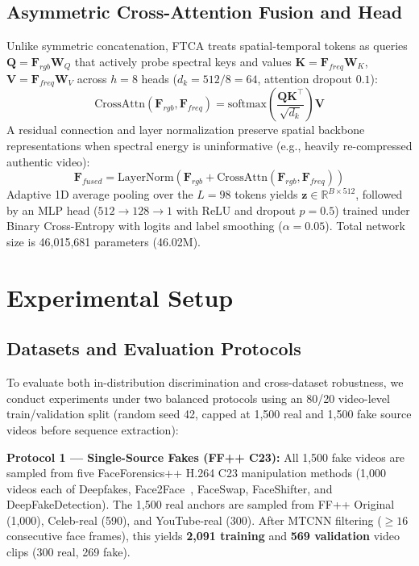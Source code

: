 \documentclass[conference,10pt]{IEEEtran}
\begin{document}
\subsection{Asymmetric Cross-Attention Fusion and Head}
Unlike symmetric concatenation, FTCA treats spatial-temporal tokens as queries $\mathbf{Q} = \mathbf{F}_{rgb}\mathbf{W}_Q$ that actively probe spectral keys and values $\mathbf{K} = \mathbf{F}_{freq}\mathbf{W}_K$, $\mathbf{V} = \mathbf{F}_{freq}\mathbf{W}_V$ across $h=8$ heads ($d_k = 512/8 = 64$, attention dropout $0.1$):
\begin{equation}
    \text{CrossAttn}(\mathbf{F}_{rgb}, \mathbf{F}_{freq}) = \text{softmax}\!\left(\frac{\mathbf{Q}\mathbf{K}^\top}{\sqrt{d_k}}\right)\mathbf{V}
\end{equation}
A residual connection and layer normalization preserve spatial backbone representations when spectral energy is uninformative (e.g., heavily re-compressed authentic video):
\begin{equation}
    \mathbf{F}_{fused} = \text{LayerNorm}\!\left(\mathbf{F}_{rgb} + \text{CrossAttn}(\mathbf{F}_{rgb}, \mathbf{F}_{freq})\right)
\end{equation}
Adaptive 1D average pooling over the $L=98$ tokens yields $\mathbf{z} \in \mathbb{R}^{B \times 512}$, followed by an MLP head ($512 \rightarrow 128 \rightarrow 1$ with ReLU and dropout $p=0.5$) trained under Binary Cross-Entropy with logits and label smoothing ($\alpha=0.05$). Total network size is 46,015,681 parameters (46.02M).

\section{Experimental Setup}

\subsection{Datasets and Evaluation Protocols}
\label{sec:datasets}
To evaluate both in-distribution discrimination and cross-dataset robustness, we conduct experiments under two balanced protocols using an 80/20 video-level train/validation split (random seed 42, capped at 1,500 real and 1,500 fake source videos before sequence extraction):

\textbf{Protocol 1 --- Single-Source Fakes (FF++ C23):} All 1,500 fake videos are sampled from five FaceForensics++ H.264 C23 manipulation methods (1,000 videos each of Deepfakes, Face2Face~\cite{thies2016face2face}, FaceSwap, FaceShifter, and DeepFakeDetection). The 1,500 real anchors are sampled from FF++ Original (1,000), Celeb-real (590), and YouTube-real (300). After MTCNN filtering ($\ge 16$ consecutive face frames), this yields \textbf{2,091 training} and \textbf{569 validation} video clips (300 real, 269 fake).
\end{document}
